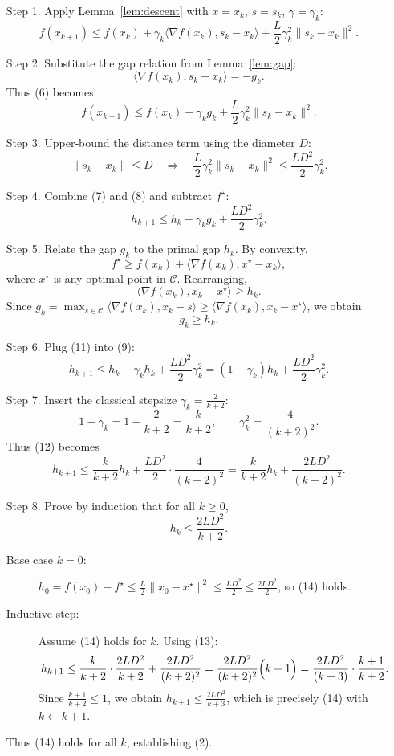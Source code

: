 \documentclass{article}
\begin{document}
\begin{enumerate}
\item[Step 1.] Apply Lemma~\ref{lem:descent} with $x=x_k$, $s=s_k$, $\gamma=\gamma_k$:
\[
f(x_{k+1}) \le f(x_k) + \gamma_k\langle\nabla f(x_k),s_k-x_k\rangle
          + \frac{L}{2}\gamma_k^{2}\|s_k-x_k\|^{2}. \tag{6}
\]

\item[Step 2.] Substitute the gap relation from Lemma~\ref{lem:gap}:
\[
\langle\nabla f(x_k),s_k-x_k\rangle = -g_k .
\]
Thus (6) becomes
\[
f(x_{k+1}) \le f(x_k) - \gamma_k g_k + \frac{L}{2}\gamma_k^{2}\|s_k-x_k\|^{2}. \tag{7}
\]

\item[Step 3.] Upper‑bound the distance term using the diameter $D$:
\[
\|s_k-x_k\|\le D\quad\Longrightarrow\quad
\frac{L}{2}\gamma_k^{2}\|s_k-x_k\|^{2}\le \frac{L D^{2}}{2}\gamma_k^{2}. \tag{8}
\]

\item[Step 4.] Combine (7) and (8) and subtract $f^\star$:
\[
h_{k+1} \le h_k - \gamma_k g_k + \frac{L D^{2}}{2}\gamma_k^{2}. \tag{9}
\]

\item[Step 5.] Relate the gap $g_k$ to the primal gap $h_k$.  By convexity,
\[
f^\star \ge f(x_k) + \langle\nabla f(x_k),x^\star - x_k\rangle,
\]
where $x^\star$ is any optimal point in $\mathcal{C}$. Rearranging,
\[
\langle\nabla f(x_k),x_k - x^\star\rangle \ge h_k . \tag{10}
\]
Since $g_k = \max_{s\in\mathcal{C}}\langle\nabla f(x_k),x_k-s\rangle \ge \langle\nabla f(x_k),x_k-x^\star\rangle$, we obtain
\[
g_k \ge h_k . \tag{11}
\]

\item[Step 6.] Plug (11) into (9):
\[
h_{k+1} \le h_k - \gamma_k h_k + \frac{L D^{2}}{2}\gamma_k^{2}
          = (1-\gamma_k)h_k + \frac{L D^{2}}{2}\gamma_k^{2}. \tag{12}
\]

\item[Step 7.] Insert the classical stepsize $\displaystyle\gamma_k=\frac{2}{k+2}$:
\[
1-\gamma_k = 1-\frac{2}{k+2}= \frac{k}{k+2},\qquad
\gamma_k^{2}= \frac{4}{(k+2)^{2}} .
\]
Thus (12) becomes
\[
h_{k+1} \le \frac{k}{k+2}h_k + \frac{L D^{2}}{2}\cdot\frac{4}{(k+2)^{2}}
          = \frac{k}{k+2}h_k + \frac{2L D^{2}}{(k+2)^{2}}. \tag{13}
\]

\item[Step 8.] Prove by induction that for all $k\ge 0$,
\[
h_k \le \frac{2L D^{2}}{k+2}. \tag{14}
\]
\begin{description}
\item[Base case $k=0$:] $h_0 = f(x_0)-f^\star \le \frac{L}{2}\|x_0-x^\star\|^{2}\le \frac{L D^{2}}{2}\le \frac{2L D^{2}}{2}$, so (14) holds.
\item[Inductive step:] Assume (14) holds for $k$.  Using (13):
\[
h_{k+1}
\le \frac{k}{k+2}\cdot\frac{2L D^{2}}{k+2}
   + \frac{2L D^{2}}{(k+2)^{2}}
= \frac{2L D^{2}}{(k+2)^{2}}\Bigl(k+1\Bigr)
= \frac{2L D^{2}}{(k+3)}\cdot\frac{k+1}{k+2}.
\]
Since $\frac{k+1}{k+2}\le 1$, we obtain $h_{k+1}\le \frac{2L D^{2}}{k+3}$, which is precisely (14) with $k\leftarrow k+1$.
\end{description}
Thus (14) holds for all $k$, establishing (2).


\end{enumerate}
\end{document}
